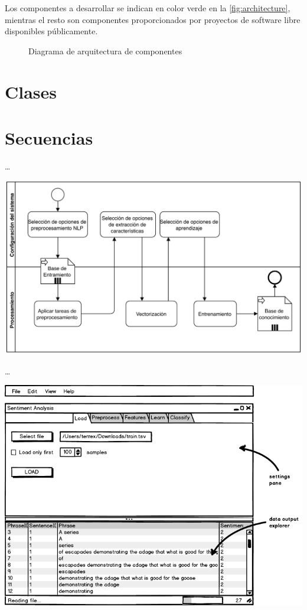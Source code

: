 Los componentes a desarrollar se indican en color verde en la \autoref{fig:architecture}, mientras el resto son componentes proporcionados por proyectos de software libre disponibles públicamente.

\begin{figure}[htbp]
\centering
\vspace{0.5cm}
\resizebox{0.75\textwidth}{!}{}
\caption{Diagrama de arquitectura de componentes}
\label{fig:architecture}
\end{figure}


\section{Clases}

\section{Secuencias}




\resizebox{0.5\textwidth}{!}{}

\ldots

\includegraphics[width=\textwidth]{bpmn-entrenamiento}

\ldots

\includegraphics[width=14cm]{gui-1-load}


